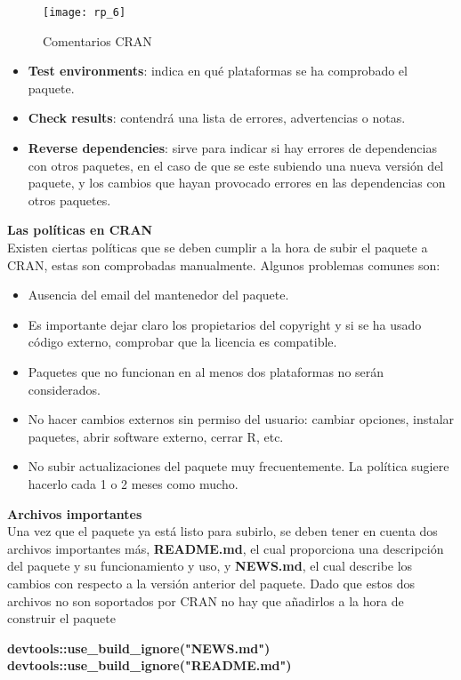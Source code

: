 \begin{figure}[H]
    \centering
    \texttt{[image: rp\_6]}
    \caption{Comentarios CRAN}
    \label{fig:comentarios}
\end{figure} 
\begin{itemize}

    \item \textbf{Test environments}: indica en qu\'e plataformas se ha comprobado el paquete.
    \item \textbf{Check results}: contendr\'a una lista de errores, advertencias o notas.
    \item \textbf{Reverse dependencies}: sirve para indicar si hay errores de dependencias con otros paquetes, en el caso de que se este  subiendo una nueva versi\'on del paquete, y los cambios que  hayan provocado errores en las dependencias con otros paquetes.
\end{itemize}

\textbf{Las pol\'iticas en CRAN}\\
Existen ciertas pol\'iticas que se deben cumplir a la hora de subir el paquete a CRAN, estas son comprobadas manualmente. Algunos problemas comunes son:
\begin{itemize}
    \item Ausencia del email del mantenedor del paquete. 
    \item Es importante dejar claro los propietarios del copyright y si se ha usado c\'odigo externo, comprobar que la licencia es compatible.
    \item Paquetes que no funcionan en al menos dos plataformas no ser\'an considerados.
    \item No hacer cambios externos sin permiso del usuario: cambiar opciones, instalar paquetes, abrir software externo, cerrar R, etc.
    \item No subir actualizaciones del paquete muy frecuentemente. La pol\'itica sugiere hacerlo cada 1 o 2 meses como mucho.
\end{itemize}

\textbf{Archivos importantes}\\
Una vez que el paquete ya est\'a listo para subirlo, se deben  tener en cuenta dos archivos importantes m\'as,\textbf{ README.md}, el cual proporciona una descripci\'on del paquete y su
funcionamiento y uso, y \textbf{NEWS.md}, el cual describe los cambios con respecto a la versi\'on anterior del paquete. Dado que estos dos archivos no son soportados por CRAN no
hay que a\~nadirlos a la hora de construir el paquete
\begin{center}
    \textbf{devtools::use\_build\_ignore("NEWS.md")
    devtools::use\_build\_ignore("README.md")}
\end{center}


